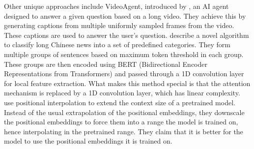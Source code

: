 	Other unique approaches include VideoAgent, introduced by \citet{wang2024videoagent}, an
	AI agent designed to answer a given question based on a long video.
	They achieve this by generating captions from multiple uniformly sampled frames from the
	video.
	These captions are used to answer the user's question.
	\citet{chen2022long} describe a novel algorithm to classify long Chinese news into a set
	of predefined categories.
	They form multiple groups of sentences based on maximum token threshold in each group.
	These groups are then encoded using BERT (Bidirectional Encoder Representations from
	Transformers) and passed through a 1D convolution layer for local feature extraction.
	What makes this method special is that the attention mechanism is replaced by a 1D
	convolution layer, which has linear complexity.
	\citet{chen2023extending} use positional interpolation to extend the context size of a
	pretrained model.
	Instead of the usual extrapolation of the positional embeddings, they downscale the positional
	embeddings to force them into a range the model is trained on, hence interpolating in the
	pretrained range.
	They claim that it is better for the model to use the positional embeddings it is trained on.
